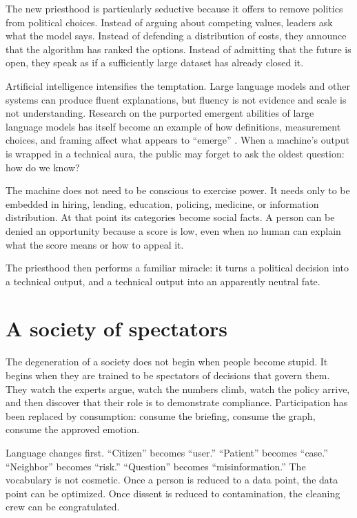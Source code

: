 ﻿\documentclass[12pt,a4paper]{book}
\begin{document}
The new priesthood is particularly seductive because it offers to remove
politics from political choices. Instead of arguing about competing values,
leaders ask what the model says. Instead of defending a distribution of costs,
they announce that the algorithm has ranked the options. Instead of admitting
that the future is open, they speak as if a sufficiently large dataset has
already closed it.

Artificial intelligence intensifies the temptation. Large language models and
other systems can produce fluent explanations, but fluency is not evidence and
scale is not understanding. Research on the purported emergent abilities of
large language models has itself become an example of how definitions,
measurement choices, and framing affect what appears to ``emerge''
\cite{Wei2022Jun}. When a machine's output is wrapped in a technical aura,
the public may forget to ask the oldest question: how do we know?

The machine does not need to be conscious to exercise power. It needs only to
be embedded in hiring, lending, education, policing, medicine, or information
distribution. At that point its categories become social facts. A person can
be denied an opportunity because a score is low, even when no human can
explain what the score means or how to appeal it.

The priesthood then performs a familiar miracle: it turns a political decision
into a technical output, and a technical output into an apparently neutral
fate.

\section{A society of spectators}

The degeneration of a society does not begin when people become stupid. It
begins when they are trained to be spectators of decisions that govern them.
They watch the experts argue, watch the numbers climb, watch the policy arrive,
and then discover that their role is to demonstrate compliance. Participation
has been replaced by consumption: consume the briefing, consume the graph,
consume the approved emotion.

Language changes first. ``Citizen'' becomes ``user.'' ``Patient'' becomes
``case.'' ``Neighbor'' becomes ``risk.'' ``Question'' becomes ``misinformation.''
The vocabulary is not cosmetic. Once a person is reduced to a data point, the
data point can be optimized. Once dissent is reduced to contamination, the
cleaning crew can be congratulated.
\end{document}
